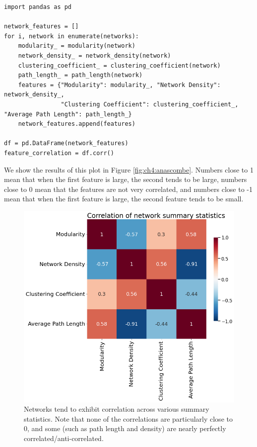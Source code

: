 \begin{lstlisting}[style=python]
import pandas as pd

network_features = []
for i, network in enumerate(networks):
    modularity_ = modularity(network)
    network_density_ = network_density(network)
    clustering_coefficient_ = clustering_coefficient(network)
    path_length_ = path_length(network)
    features = {"Modularity": modularity_, "Network Density": network_density_, 
                "Clustering Coefficient": clustering_coefficient_, "Average Path Length": path_length_}
    network_features.append(features)
    
df = pd.DataFrame(network_features)
feature_correlation = df.corr()
\end{lstlisting}
We show the results of this plot in Figure \ref{fig:ch4:anascombe}. Numbers close to 1 mean that when the first feature is large, the second tends to be large, numbers close to 0 mean that the features are not very correlated, and numbers close to -1 mean that when the first feature is large, the second feature tends to be small. 

\begin{figure}[h]
    \centering
    \includegraphics[width=0.8\linewidth]{representations/ch4/Images/corr.png}
    \caption[Correlation of netework features experiment]{Networks tend to exhibit correlation across various summary statistics. Note that none of the correlations are particularly close to $0$, and some (such as path length and density) are nearly perfectly correlated/anti-correlated.}
    \label{fig:ch4:corr}
\end{figure}


